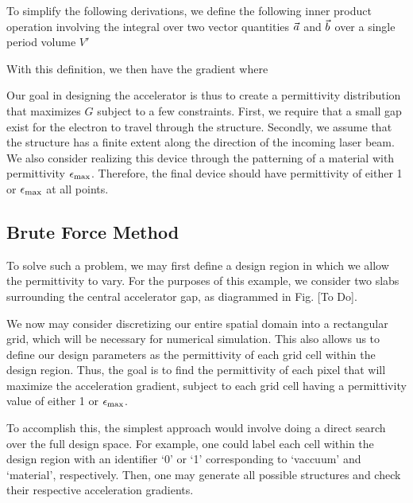 To simplify the following derivations, we define the following inner product operation involving the integral over two vector quantities $\vec{a}$ and $\vec{b}$ over a single period volume $V'$
%

With this definition, we then have the gradient
%
%
where



Our goal in designing the accelerator is thus to create a permittivity distribution that maximizes $G$ subject to a few constraints.
First, we require that a small gap exist for the electron to travel through the structure.
Secondly, we assume that the structure has a finite extent along the direction of the incoming laser beam.
We also consider realizing this device through the patterning of a material with permittivity $\epsilon_\textrm{max}$.  
Therefore, the final device should have permittivity of either 1 or $\epsilon_\textrm{max}$ at all points.

\subsection{Brute Force Method}

To solve such a problem, we may first define a design region in which we allow the permittivity to vary.
For the purposes of this example, we consider two slabs surrounding the central accelerator gap, as diagrammed in Fig. [To Do].

We now may consider discretizing our entire spatial domain into a rectangular grid, which will be necessary for numerical simulation.
This also allows us to define our design parameters as the permittivity of each grid cell within the design region.  Thus, the goal is to find the permittivity of each pixel that will maximize the acceleration gradient, subject to each grid cell having a permittivity value of either 1 or $\epsilon_\textrm{max}$.

To accomplish this, the simplest approach would involve doing a direct search over the full design space.  For example, one could label each cell within the design region with an identifier `0' or `1' corresponding to `vaccuum' and `material', respectively.  Then, one may generate all possible structures and check their respective acceleration gradients.

